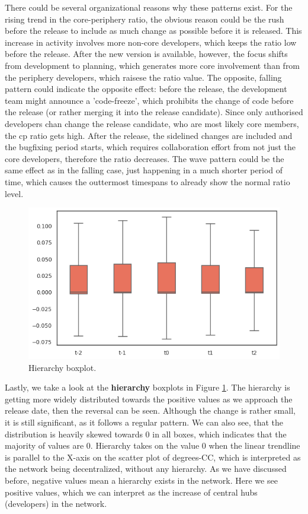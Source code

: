 There could be several organizational reasons why these patterns exist. For the rising trend in the core-periphery ratio, the obvious reason could be the rush before the release to include as much change as possible before it is released. This increase in activity involves more non-core developers, which keeps the ratio low before the release. After the new version is available, however, the focus shifts from development to planning, which generates more core involvement than from the periphery developers, which raisese the ratio value. The opposite, falling pattern could indicate the opposite effect: before the release, the development team might announce a 'code-freeze', which prohibits the change of code before the release (or rather merging it into the release candidate). Since only authorised developers chan change the release candidate, who are most likely core members, the cp ratio gets high. After the release, the sidelined changes are included and the bugfixing period starts, which requires collaboration effort from not just the core developers, therefore the ratio decreases. The wave pattern could be the same effect as in the falling case, just happening in a much shorter period of time, which causes the outtermost timespans to already show the normal ratio level. \\

\begin{figure}
    \centering
    \includegraphics[width=\textwidth]{figures/quantitative/boxplots/hierarchy.png}
    \caption{Hierarchy boxplot.}
    \label{fig:hierarchy-box}
\end{figure}

Lastly, we take a look at the \textbf{hierarchy} boxplots in Figure \ref{fig:hierarchy-box}. The hierarchy is getting more widely distributed towards the positive values as we approach the release date, then the reversal can be seen. Although the change is rather small, it is still significant, as it follows a regular pattern. We can also see, that the distribution is heavily skewed towards $0$ in all boxes, which indicates that the majority of values are $0$. Hierarchy takes on the value $0$ when the linear trendline is parallel to the X-axis on the scatter plot of degrees-CC, which is interpreted as the network being decentralized, without any hierarchy. As we have discussed before, negative values mean a hierarchy exists in the network. Here we see positive values, which we can interpret as the increase of central hubs (developers) in the network. 

